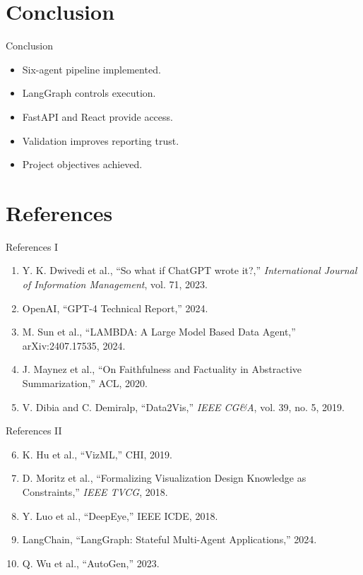 \documentclass[10pt,aspectratio=43]{beamer}
\begin{document}
\section{Conclusion}
\begin{frame}{Conclusion}
\begin{itemize}
  \item Six-agent pipeline implemented.
  \item LangGraph controls execution.
  \item FastAPI and React provide access.
  \item Validation improves reporting trust.
  \item Project objectives achieved.
\end{itemize}
\end{frame}

\section{References}
\begin{frame}{References I}
\footnotesize
\begin{enumerate}
  \item Y. K. Dwivedi et al., ``So what if ChatGPT wrote it?,'' \emph{International Journal of Information Management}, vol. 71, 2023.
  \item OpenAI, ``GPT-4 Technical Report,'' 2024.
  \item M. Sun et al., ``LAMBDA: A Large Model Based Data Agent,'' arXiv:2407.17535, 2024.
  \item J. Maynez et al., ``On Faithfulness and Factuality in Abstractive Summarization,'' ACL, 2020.
  \item V. Dibia and C. Demiralp, ``Data2Vis,'' \emph{IEEE CG\&A}, vol. 39, no. 5, 2019.
\end{enumerate}
\end{frame}

\begin{frame}{References II}
\footnotesize
\begin{enumerate}
  \setcounter{enumi}{5}
  \item K. Hu et al., ``VizML,'' CHI, 2019.
  \item D. Moritz et al., ``Formalizing Visualization Design Knowledge as Constraints,'' \emph{IEEE TVCG}, 2018.
  \item Y. Luo et al., ``DeepEye,'' IEEE ICDE, 2018.
  \item LangChain, ``LangGraph: Stateful Multi-Agent Applications,'' 2024.
  \item Q. Wu et al., ``AutoGen,'' 2023.
\end{enumerate}
\end{frame}
\end{document}
